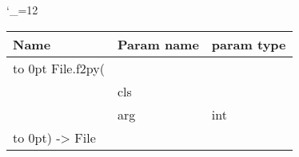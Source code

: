 \begingroup \catcode`\_=12 \tt
\begin{tabular}{lll}
\toprule
\textrm{Name}&\textrm{Param name}&\textrm{param type}\\
\midrule
\hbox to 0pt {File.f2py(\hss}\\
& cls\\
& arg & int\\
\hbox to 0pt{) -> File\hss}\\
\bottomrule
\end{tabular}
\endgroup
